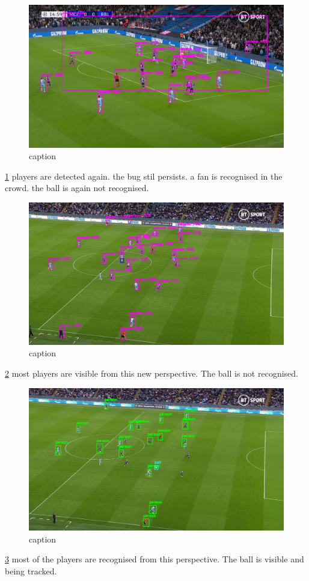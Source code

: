 \documentclass[
11pt,
twoside
]{report}
\begin{document}
\begin{figure}[H]
    \includegraphics[keepaspectratio, width=\columnwidth]{Screenshot_2022-03-03_23-08-00.png}
    \caption{caption}
    \label{img:12}
\end{figure}
\ref{img:12} players
are detected again. the bug stil persists. a fan is recognised in the
crowd. the ball is again not recognised.

\begin{figure}[H]
    \includegraphics[keepaspectratio, width=\columnwidth]{Screenshot_2022-03-03_23-09-45.png}
    \caption{caption}
    \label{img:13}
\end{figure}
\ref{img:13} most
players are visible from this new perspective. The ball is not
recognised.

\begin{figure}[H]
    \includegraphics[keepaspectratio, width=\columnwidth]{Screenshot_2022-03-03_23-10-58.png}
    \caption{caption}
    \label{img:14}
\end{figure}
\ref{img:14} most of
the players are recognised from this perspective. The ball is visible
and being tracked.
\end{document}
